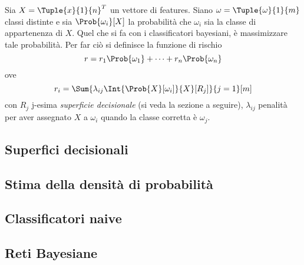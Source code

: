 \documentclass{subfiles}
\begin{document}
Sia \(X = \Tuple{x}{1}{n}^{T}\) un vettore di features.
Siano \(\omega = \Tuple{\omega}{1}{m}\) classi distinte e sia \(\Prob{\omega_{i}}[X]\) la probabilità che \(\omega_{i}\) sia la classe di appartenenza di \(X\).
Quel che si fa con i classificatori bayesiani, è massimizzare tale probabilità.
Per far ciò si definisce la funzione di rischio
\[
    r = r_{1} \Prob{\omega_{1}} + \cdots + r_{n} \Prob{\omega_{n}}
\]
ove
\[
    r_{i} = \Sum{\lambda_{ij} \Int{\Prob{X}[\omega_{i}]}{X}[R_{j}]}{j = 1}[m]
\]
con \(R_{j}\) j-esima \emph{superficie decisionale} (si veda la sezione a seguire),
\(\lambda_{ij}\) penalità per aver assegnato \(X\) a \(\omega_{i}\) quando la classe corretta è \(\omega_{j}\).

\subsection{Superfici decisionali}


\subsection{Stima della densità di probabilità}


\subsection{Classificatori naive}


\subsection{Reti Bayesiane}

\clearpage
\end{document}
